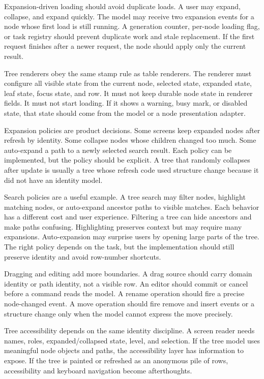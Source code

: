 Expansion-driven loading should avoid duplicate loads. A user may expand, collapse, and expand quickly. The model may receive two expansion events for a node whose first load is still running. A generation counter, per-node loading flag, or task registry should prevent duplicate work and stale replacement. If the first request finishes after a newer request, the node should apply only the current result.

Tree renderers obey the same stamp rule as table renderers. The renderer must configure all visible state from the current node, selected state, expanded state, leaf state, focus state, and row. It must not keep durable node state in renderer fields. It must not start loading. If it shows a warning, busy mark, or disabled state, that state should come from the model or a node presentation adapter.

Expansion policies are product decisions. Some screens keep expanded nodes after refresh by identity. Some collapse nodes whose children changed too much. Some auto-expand a path to a newly selected search result. Each policy can be implemented, but the policy should be explicit. A tree that randomly collapses after update is usually a tree whose refresh code used structure change because it did not have an identity model.

Search policies are a useful example. A tree search may filter nodes, highlight matching nodes, or auto-expand ancestor paths to visible matches. Each behavior has a different cost and user experience. Filtering a tree can hide ancestors and make paths confusing. Highlighting preserves context but may require many expansions. Auto-expansion may surprise users by opening large parts of the tree. The right policy depends on the task, but the implementation should still preserve identity and avoid row-number shortcuts.

Dragging and editing add more boundaries. A drag source should carry domain identity or path identity, not a visible row. An editor should commit or cancel before a command reads the model. A rename operation should fire a precise node-changed event. A move operation should fire remove and insert events or a structure change only when the model cannot express the move precisely.

Tree accessibility depends on the same identity discipline. A screen reader needs names, roles, expanded/collapsed state, level, and selection. If the tree model uses meaningful node objects and paths, the accessibility layer has information to expose. If the tree is painted or refreshed as an anonymous pile of rows, accessibility and keyboard navigation become afterthoughts.

